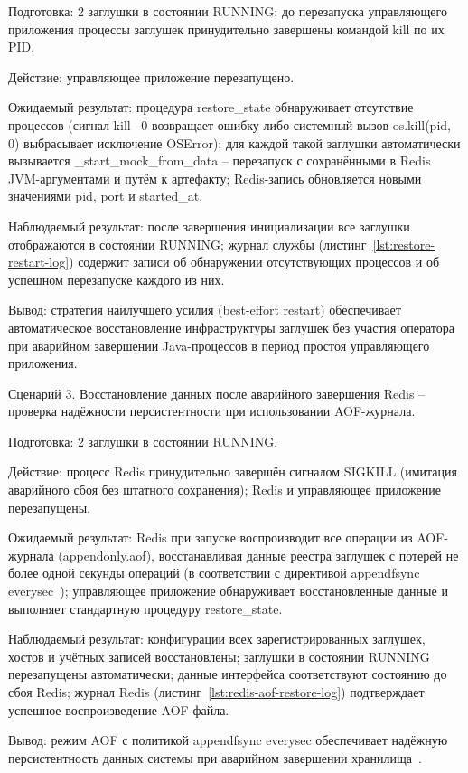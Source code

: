 \begin{compactlist}
\item Подготовка: 2 заглушки в состоянии RUNNING; до перезапуска управляющего приложения процессы заглушек принудительно завершены командой kill по их PID.
\item Действие: управляющее приложение перезапущено.
\item Ожидаемый результат: процедура restore\_state обнаруживает отсутствие процессов (сигнал kill~-0 возвращает ошибку либо системный вызов os.kill(pid, 0) выбрасывает исключение OSError); для каждой такой заглушки автоматически вызывается \_start\_mock\_from\_data -- перезапуск с сохранёнными в Redis JVM-аргументами и путём к артефакту; Redis-запись обновляется новыми значениями pid, port и started\_at.
\item Наблюдаемый результат: после завершения инициализации все заглушки отображаются в состоянии RUNNING; журнал службы (листинг~\ref{lst:restore-restart-log}) содержит записи об обнаружении отсутствующих процессов и об успешном перезапуске каждого из них.
\item Вывод: стратегия наилучшего усилия (best-effort restart) обеспечивает автоматическое восстановление инфраструктуры заглушек без участия оператора при аварийном завершении Java-процессов в период простоя управляющего приложения.
\end{compactlist}

Сценарий 3. Восстановление данных после аварийного завершения Redis -- проверка надёжности персистентности при использовании AOF-журнала.

\begin{compactlist}
\item Подготовка: 2 заглушки в состоянии RUNNING.
\item Действие: процесс Redis принудительно завершён сигналом SIGKILL (имитация аварийного сбоя без штатного сохранения); Redis и управляющее приложение перезапущены.
\item Ожидаемый результат: Redis при запуске воспроизводит все операции из AOF-журнала (appendonly.aof), восстанавливая данные реестра заглушек с потерей не более одной секунды операций (в соответствии с директивой appendfsync everysec~\cite{redis-aof}); управляющее приложение обнаруживает восстановленные данные и выполняет стандартную процедуру restore\_state.
\item Наблюдаемый результат: конфигурации всех зарегистрированных заглушек, хостов и учётных записей восстановлены; заглушки в состоянии RUNNING перезапущены автоматически; данные интерфейса соответствуют состоянию до сбоя Redis; журнал Redis (листинг~\ref{lst:redis-aof-restore-log}) подтверждает успешное воспроизведение AOF-файла.
\item Вывод: режим AOF с политикой appendfsync everysec обеспечивает надёжную персистентность данных системы при аварийном завершении хранилища~\cite{macedo-redis}.
\end{compactlist}

